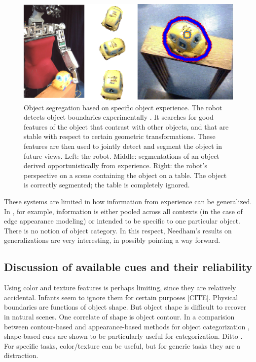 \begin{figure}[t]

\centerline{
\includegraphics[width=0.75\columnwidth]{fig-robot}
}

\caption{
%
Object segregation based on specific object experience.  The robot
detects object boundaries experimentally \cite{fitzpatrick03object}.
It searches for good features of the object that contrast with other
objects, and that are stable with respect to certain geometric
transformations.  These features are then used to jointly detect
and segment the object in future views.  Left: the robot.
Middle: segmentations of an object derived opportunistically
from experience.  Right: the robot's perspective on a scene 
containing the object on a table.  The object is correctly segmented;
the table is completely ignored.
%
}

\label{fig:robot}

\end{figure}



These systems are limited in how information from experience can be
generalized.  In , for example,
information is either pooled across all contexts (in the case of edge
appearance modeling) or intended to be specific to one particular
object.  There is no notion of object category.
%
In this respect, Needham's results on generalizations are
very interesting, in possibly pointing a way forward.


\subsection{Discussion of available cues and their reliability}

Using color and texture features is perhaps limiting, since they
are relatively accidental.  Infants seem to ignore them for
certain purposes [CITE].
%
Physical boundaries are functions of object shape.  But object shape
is difficult to recover in natural scenes.
%
One correlate of shape is object contour.  In a comparision between
contour-based and appearance-based methods for object categorization
\cite{leibe03analyzing}, shape-based cues are shown to be
particularly useful for categorization.
Ditto \cite{lecun04learning}.
For specific tasks, color/texture can be useful, but for 
generic tasks they are a distraction.

